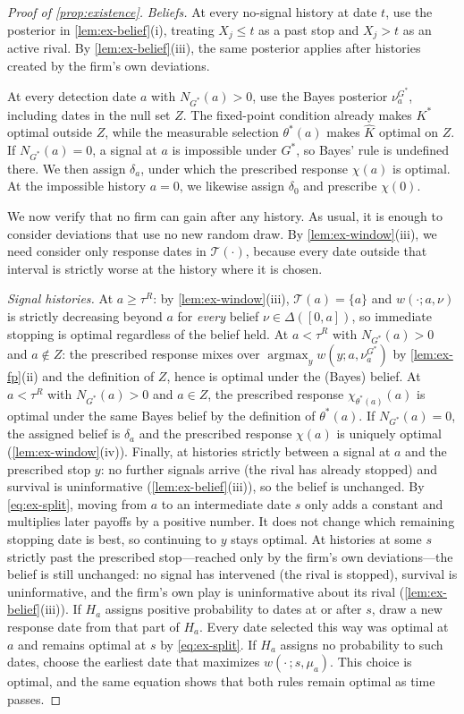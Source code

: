 \documentclass[12pt,reqno]{article}
\theoremstyle{definition} \newtheorem{example}{Example}
\theoremstyle{definition} \newtheorem{condition}{Condition}
\theoremstyle{definition} \newtheorem{corollary}{Corollary}
\theoremstyle{definition} \newtheorem{claim}{Claim}
\theoremstyle{definition} \newtheorem{definition}{Definition}
\theoremstyle{definition} \newtheorem{conjecture}{Conjecture}
\theoremstyle{definition} \newtheorem{Lemma}{Lemma}
\theoremstyle{definition} \newtheorem{lemma}{Lemma}
\theoremstyle{plain} \newtheorem{theorem}{Theorem}
\theoremstyle{definition} \newtheorem{assumption}{Assumption}
\theoremstyle{definition} \newtheorem*{assumptionnonumber}{Assumption}
\theoremstyle{definition} \newtheorem*{theoremNoNumber}{Proposition}
\theoremstyle{definition}
\theoremstyle{definition}\newtheorem{proposition}{Proposition}
\theoremstyle{definition} \newtheorem{result}{Result}
\theoremstyle{definition} \newtheorem*{definitionNoNumber}{Definition}
\theoremstyle{definition} \newtheorem{Definition}{Definition}
\theoremstyle{definition} \newtheorem*{DefinitionNoNumber}{Definition}
\theoremstyle{definition} \newtheorem*{fact}{Fact}
\theoremstyle{definition} \newtheorem*{property}{Property}
\DeclareMathOperator*{\argmax}{argmax}
\theoremstyle{definition} \newtheorem{remark}{Remark}
\begin{document}
\begin{proof}[Proof of \cref{prop:existence}]
\emph{Beliefs.}
At every no-signal history at date $t$, use the posterior in \cref{lem:ex-belief}(i), treating $X_j\le t$ as a past stop and $X_j>t$ as an active rival. By \cref{lem:ex-belief}(iii), the same posterior applies after histories created by the firm's own deviations.

At every detection date $a$ with $N_{G^\ast}(a)>0$, use the Bayes posterior $\nu^{G^\ast}_a$, including dates in the null set $Z$. The fixed-point condition already makes $K^\ast$ optimal outside $Z$, while the measurable selection $\theta^\ast(a)$ makes $\hat K$ optimal on $Z$. If $N_{G^\ast}(a)=0$, a signal at $a$ is impossible under $G^\ast$, so Bayes' rule is undefined there. We then assign $\delta_a$, under which the prescribed response $\chi(a)$ is optimal. At the impossible history $a=0$, we likewise assign $\delta_0$ and prescribe $\chi(0)$.


We now verify that no firm can gain after any history. As usual, it is enough to consider deviations that use no new random draw. By \cref{lem:ex-window}(iii), we need consider only response dates in $\mathcal T(\cdot)$, because every date outside that interval is strictly worse at the history where it is chosen.

\emph{Signal histories.} At $a\ge\tau^R$: by \cref{lem:ex-window}(iii), $\mathcal T(a)=\{a\}$ and $w(\cdot;a,\nu)$ is strictly decreasing beyond $a$ for \emph{every} belief $\nu\in\Delta([0,a])$, so immediate stopping is optimal regardless of the belief held. At $a<\tau^R$ with $N_{G^\ast}(a)>0$ and $a\notin Z$: the prescribed response mixes over $\argmax_y w(y;a,\nu^{G^\ast}_a)$ by \cref{lem:ex-fp}(ii) and the definition of $Z$, hence is optimal under the (Bayes) belief. At $a<\tau^R$ with $N_{G^\ast}(a)>0$ and $a\in Z$, the prescribed response $\chi_{\theta^\ast(a)}(a)$ is optimal under the same Bayes belief by the definition of $\theta^\ast(a)$. If $N_{G^\ast}(a)=0$, the assigned belief is $\delta_a$ and the prescribed response $\chi(a)$ is uniquely optimal (\cref{lem:ex-window}(iv)). Finally, at histories strictly between a signal at $a$ and the prescribed stop $y$: no further signals arrive (the rival has already stopped) and survival is uninformative (\cref{lem:ex-belief}(iii)), so the belief is unchanged. By \eqref{eq:ex-split}, moving from $a$ to an intermediate date $s$ only adds a constant and multiplies later payoffs by a positive number. It does not change which remaining stopping date is best, so continuing to $y$ stays optimal. At histories at some $s$ strictly past the prescribed stop---reached only by the firm's own deviations---the belief is still unchanged: no signal has intervened (the rival is stopped), survival is uninformative, and the firm's own play is uninformative about its rival (\cref{lem:ex-belief}(iii)). If $H_a$ assigns positive probability to dates at or after $s$, draw a new response date from that part of $H_a$. Every date selected this way was optimal at $a$ and remains optimal at $s$ by \eqref{eq:ex-split}. If $H_a$ assigns no probability to such dates, choose the earliest date that maximizes $w(\cdot\,;s,\mu_a)$. This choice is optimal, and the same equation shows that both rules remain optimal as time passes.


\end{proof}
\end{document}
